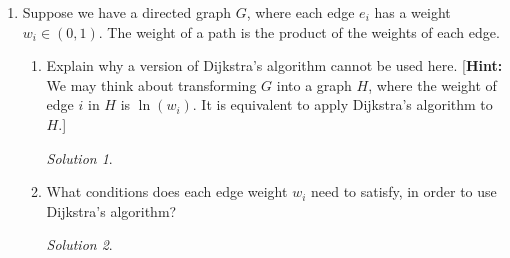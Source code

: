 \documentclass[12pt]{article}
\theoremstyle{remark}
\newtheorem*{solution}{Solution}
\begin{document}
\begin{enumerate}

\item Suppose we have a directed graph $G$, where each edge $e_{i}$ has a weight $w_{i} \in (0, 1).$  The weight of a path is the product of the weights of each edge. 
\begin{enumerate}[label=(\alph*)]
\item Explain why a version of Dijkstra's algorithm cannot be used here. [\textbf{Hint:} We may think about transforming $G$ into a graph $H$, where the weight of edge $i$ in $H$ is $\ln(w_{i})$. It is equivalent to apply Dijkstra's algorithm to $H$.]
\begin{solution}

\end{solution}

\item What conditions does each edge weight $w_{i}$ need to satisfy, in order to use Dijkstra's algorithm?
\begin{solution}

\end{solution}


\end{enumerate}



\end{enumerate}
\end{document}

